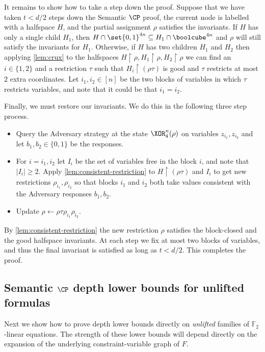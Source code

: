 \documentclass[11pt]{article}
\begin{document}
	
It remains to show how to take a step down the proof. 
Suppose that we have taken $t < d/2$ steps down the Semantic $\CP$ proof, the current node is labelled with a halfspace $H$, and the partial assignment $\rho$ satisfies the invariants.
If $H$ has only a single child $H_1$, then $H \cap \set{0,1}^{4n} \subseteq H_1 \cap \boolcube^{4n}$ and $\rho$ will still satisfy the invariants for $H_1$.
Otherwise, if $H$ has two children $H_1$ and $H_2$ then applying \autoref{lem:crux} to the halfspaces $H \restriction \rho, H_1 \restriction \rho, H_2 \restriction \rho$ we can find an $i \in \{1,2\}$ and a restriction $\tau$  such that $H_i \restriction (\rho\tau)$ is good and $\tau$ restricts at most $2$ extra coordinates.
Let $i_1, i_2 \in [n]$ be the two blocks of variables in which $\tau$ restricts variables, and note that it could be that $i_1 = i_2$.
	
Finally, we must restore our invariants.
We do this in the following three step process.
\begin{itemize}
	\item Query the Adversary strategy at the state $\XOR_4^n(\rho)$ on variables $z_{i_1}, z_{i_2}$ and let $b_1, b_2 \in \{0,1\}$ be the responses.
	\item For $i = i_1, i_2$ let $I_i$ be the set of variables free in the block $i$, and note that $|I_i| \geq 2$. 
		Apply \autoref{lem:consistent-restriction} to $H \restriction (\rho\tau)$ and $I_i$ to get new restrictions $\rho_{i_1}, \rho_{i_2}$ so that blocks $i_1$ and $i_2$ both take values consistent with the Adversary responses $b_1, b_2$.
	\item Update $\rho \leftarrow \rho\tau\rho_{i_1}\rho_{i_2}$.
\end{itemize} 
By \autoref{lem:consistent-restriction} the new restriction $\rho$ satisfies the block-closed and the good halfspace invariants.
At each step we fix at most two blocks of variables, and thus the final invariant is satisfied as long as $t < d/2$.
This completes the proof.




\subsection{Semantic \texorpdfstring{$\CP$}{CP} depth lower bounds for unlifted
  formulas}
Next we show how to prove depth lower bounds directly on \emph{unlifted} families of $\mathbb{F}_2$-linear equations. The strength of these lower bounds will depend directly on the expansion of the underlying constraint-variable graph of $F$. 
\end{document}

